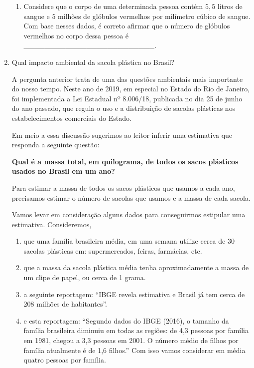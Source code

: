 \begin{enumerate}
\begin{enumerate}
\item {} 
Considere que o corpo de uma determinada pessoa contém \(5,5\) litros de sangue e \(5\) milhões de glóbulos vermelhos por milímetro cúbico de sangue. Com base nesses dados, é correto afirmar que o número de glóbulos vermelhos no corpo dessa pessoa é \_\_\_\_\_\_\_\_\_\_\_\_\_\_\_\_\_\_\_\_\_\_\_\_\_.

\end{enumerate}

\item Qual impacto ambiental da sacola plástica no Brasil?

A pergunta anterior trata de uma das questões ambientais mais importante do nosso tempo. Neste ano de 2019, em especial no Estado do Rio de Janeiro, foi implementada a Lei Estadual nº 8.006/18, publicada no dia 25 de junho do ano passado, que regula o uso e a distribuição de sacolas plásticas nos estabelecimentos comerciais do Estado.

Em meio a essa discussão sugerimos ao leitor inferir uma estimativa que responda a seguinte questão:

\textbf{Qual é a massa total, em quilograma, de todos os sacos plásticos usados no Brasil em um ano?}

Para estimar a massa de todos os sacos plásticos que usamos a cada ano, precisamos estimar o número de sacolas que usamos e a massa de cada sacola.

Vamos levar em consideração alguns dados para conseguirmos estipular uma estimativa. Consideremos,
\begin{enumerate}
\item {} 
que uma família brasileira média, em uma semana utilize cerca de 30 sacolas plásticas em: supermercados, feiras, farmácias, etc.

\item {} 
que a massa da sacola plástica média tenha aproximadamente a massa de um clipe de papel, ou cerca de 1 grama.

\item {} 
a seguinte reportagem: “IBGE revela estimativa e Brasil já tem cerca de 208 milhões de habitantes”.

\item {} 
e esta reportagem: “Segundo dados do IBGE (2016), o tamanho da família brasileira diminuiu em todas as regiões: de 4,3 pessoas por família em 1981, chegou a 3,3 pessoas em 2001. O número médio de filhos por família atualmente é de 1,6 filhos.” Com isso vamos considerar em média quatro pessoas por família.

\end{enumerate}

\end{enumerate}

\ifnum{}
\clearpage
\else
\notasfinais
\fi




\nocite{*}